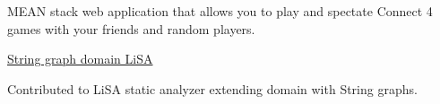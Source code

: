 \documentclass[10pt,a4paper,ragged2e,withhyper]{altacv}
\begin{document}
\begin{paracol}{2}
MEAN stack web application that allows you to play and spectate Connect 4 games with your friends and random players.
\medskip


\faGithub\href{https://github.com/faccimatteo/StringGraphDomain-LiSA}{String graph domain LiSA}
\par

Contributed to LiSA static analyzer extending domain with String graphs.

\end{paracol}
\end{document}

